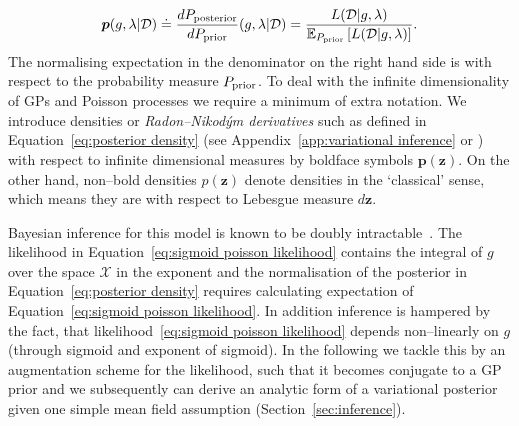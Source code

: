 \documentclass[twoside,11pt]{article}
\newcommand{\dataset}{{\cal D}}
\newcommand{\EE}[2]{\mathbb{E}_{#1}\left[ #2 \right]}
\newcommand{\bs}[1]{\boldsymbol{#1}}
\newcommand{\X}{\mathcal{X}}
\begin{document}
\begin{equation}\label{eq:posterior density}
\bs{p}(g,\lambda\vert \dataset) \doteq \frac{dP_{\rm posterior}}{dP_{\rm prior}}(g,\lambda\vert \dataset) = \frac{L(\dataset \vert g,\lambda)}{\EE{P_{\rm prior}}{L(\dataset \vert g,\lambda)}}.
\end{equation}
The normalising expectation in the denominator on the right hand side is with respect to the probability measure $P_{\rm prior}$. To deal with the infinite dimensionality of GPs and Poisson processes we require a minimum of extra notation. We introduce densities or {\em Radon--Nikod\'ym derivatives } such as defined in Equation~\eqref{eq:posterior density} (see Appendix~\ref{app:variational inference} or \citet{matthews2016sparse}) with respect to infinite dimensional measures by boldface symbols $\bs{p}(\bs{z})$. On the other hand, non--bold densities $p(\bs{z})$ denote densities in the `classical' sense, which means they are with respect to Lebesgue measure $d\bs{z}$. 

Bayesian inference for this model is known to be doubly intractable~\citep{murray2006mcmc}. The likelihood in Equation~\eqref{eq:sigmoid poisson likelihood} contains the integral of $g$ over the space $\X$ in the exponent and the normalisation of the posterior in Equation~\eqref{eq:posterior density} requires calculating expectation of Equation~\eqref{eq:sigmoid poisson likelihood}. In addition inference is hampered by the fact, that likelihood~\eqref{eq:sigmoid poisson likelihood} depends non--linearly on $g$ (through sigmoid and exponent of sigmoid). In the following we tackle this by an augmentation scheme for the likelihood, such that it becomes conjugate to a GP prior and we subsequently can derive an analytic form of a variational posterior given one simple mean field assumption (Section~\ref{sec:inference}).

\end{document}
